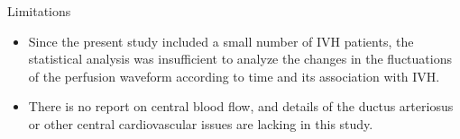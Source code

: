\documentclass{beamer}
\begin{document}
\begin{frame}{Limitations}
    \begin{itemize}
        \item Since the present study included a small number of IVH patients,
            the statistical analysis was insufficient to analyze the changes in
            the fluctuations of the perfusion waveform according to time and
            its association with IVH.
        \item There is no report on central blood flow, and details of the
            ductus arteriosus or other central cardiovascular issues are
            lacking in this study.
    \end{itemize}
\end{frame}
\end{document}
